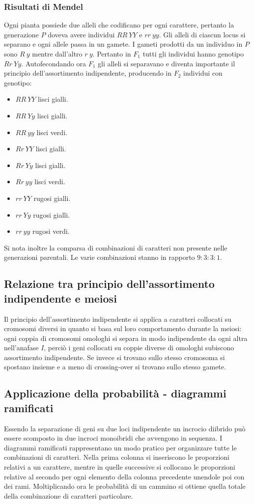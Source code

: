 \subsubsection{Risultati di Mendel}
Ogni pianta possiede due alleli che codificano per ogni carattere, pertanto la generazione $P$ doveva avere individui $RR\ YY$ e $rr\ yy$. Gli alleli di ciascun locus si separano e ogni allele passa in
un gamete. I gameti prodotti da un individuo in $P$ sono $R\ y$ mentre dall'altro $r\ y$. Pertanto in $F_1$ tutti gli individui hanno genotipo $Rr\ Yy$. Autofecondando ora $F_1$ gli alleli si 
separavano e diventa importante il principio dell'assortimento indipendente, producendo in $F_2$ individui con genotipo:
\begin{multicols}{2}
	\begin{itemize}
		\item $RR\ YY$ lisci gialli.
		\item $RR\ Yy$ lisci gialli.
		\item $RR\ yy$ lisci verdi.
		\item $Rr\ YY$ lisci gialli.
		\item $Rr\ Yy$ lisci gialli.
		\item $Rr\ yy$ lisci verdi.
		\item $rr\ YY$ rugosi gialli.
		\item $rr\ Yy$ rugosi gialli.
		\item $rr\ yy$ rugosi verdi.
	\end{itemize}
\end{multicols}
Si nota inoltre la comparsa di combinazioni di caratteri non presente nelle generazioni parentali. Le varie combinazioni stanno in rapporto $9:3:3:1$.
\subsection{Relazione tra principio dell'assortimento indipendente e meiosi}
Il principio dell'assortimento indipendente si applica a caratteri collocati su cromosomi diversi in quanto si basa sul loro comportamento durante la meiosi: ogni coppia di cromosomi omologhi si separa
in modo indipendente da ogni altra nell'anafase $I$, perci\`o i geni collocati su coppie diverse di omologhi subiscono assortimento indipendente. Se invece si trovano sullo stesso cromosoma si spostano
insieme e a meno di crossing-over si trovano sullo stesso gamete. 
\subsection{Applicazione della probabilit\`a - diagrammi ramificati}
Essendo la separazione di geni su due loci indipendente un incrocio diibrido pu\`o essere scomposto in due incroci monoibridi che avvengono in sequenza. I diagrammi ramificati rappresentano un modo 
pratico per organizzare tutte le combinazioni di caratteri. Nella prima colonna si inseriscono le proporzioni relativi a un carattere, mentre in quelle successive si collocano le proporzioni relative
al secondo per ogni elemento della colonna precedente unendole poi con dei rami. Moltiplicando ora le probabilit\`a di un cammino si ottiene quella totale della combinazione di caratteri particolare. 
